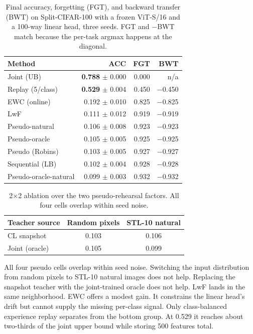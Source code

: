 \documentclass[conference]{IEEEtran}
\begin{document}
\begin{table}[t]
\centering
\caption{Final accuracy, forgetting (FGT), and backward transfer (BWT) on
Split-CIFAR-100 with a frozen ViT-S/16 and a 100-way linear head, three
seeds. FGT and $-$BWT match because the per-task argmax happens at the
diagonal.}
\label{tab:main}
\small
\begin{tabular}{@{}lrrr@{}}
\toprule
Method & ACC & FGT & BWT \\
\midrule
Joint (UB)              & \textbf{0.788} $\pm$ 0.000 & 0.000 & n/a \\
Replay (5/class)        & \textbf{0.529} $\pm$ 0.004 & 0.450 & $-$0.450 \\
EWC (online)            & 0.192 $\pm$ 0.010 & 0.825 & $-$0.825 \\
LwF                     & 0.111 $\pm$ 0.012 & 0.919 & $-$0.919 \\
Pseudo-natural          & 0.106 $\pm$ 0.008 & 0.923 & $-$0.923 \\
Pseudo-oracle           & 0.105 $\pm$ 0.005 & 0.925 & $-$0.925 \\
Pseudo (Robins)         & 0.103 $\pm$ 0.005 & 0.927 & $-$0.927 \\
Sequential (LB)         & 0.102 $\pm$ 0.004 & 0.928 & $-$0.928 \\
Pseudo-oracle-natural   & 0.099 $\pm$ 0.003 & 0.932 & $-$0.932 \\
\bottomrule
\end{tabular}
\end{table}

\begin{table}[t]
\centering
\caption{2$\times$2 ablation over the two pseudo-rehearsal factors. All
four cells overlap within seed noise.}
\label{tab:twobytwo}
\small
\begin{tabular}{@{}lcc@{}}
\toprule
Teacher source & Random pixels & STL-10 natural \\
\midrule
CL snapshot        & 0.103 & 0.106 \\
Joint (oracle)     & 0.105 & 0.099 \\
\bottomrule
\end{tabular}
\end{table}

All four pseudo cells overlap within seed noise. Switching the input
distribution from random pixels to STL-10 natural images does not help.
Replacing the snapshot teacher with the joint-trained oracle does not
help. LwF lands in the same neighborhood. EWC offers a modest gain. It
constrains the linear head's drift but cannot supply the missing per-class
signal. Only class-balanced experience replay separates from the bottom
group. At 0.529 it reaches about two-thirds of the joint upper bound
while storing 500 features total.
\end{document}
